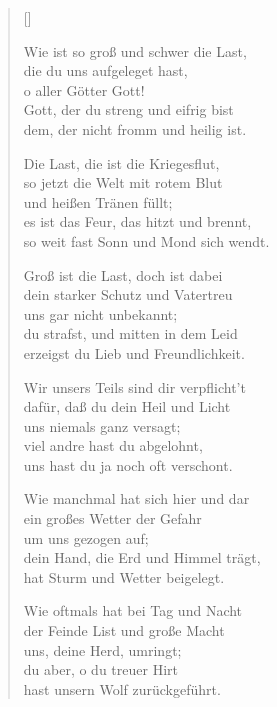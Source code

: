 \begin{multicols}{2}
\settowidth{\versewidth}{Wir unsers Teils sind dir verpflicht't}
\begin{verse}[\versewidth]

 Wie ist so groß und schwer die Last,\\
die du uns aufgeleget hast,\\
o aller Götter Gott!\\
Gott, der du streng und eifrig bist\\
dem, der nicht fromm und heilig ist.

 Die Last, die ist die Kriegesflut,\\
so jetzt die Welt mit rotem Blut\\
und heißen Tränen füllt;\\
es ist das Feur, das hitzt und brennt,\\
so weit fast Sonn und Mond sich wendt.

 Groß ist die Last, doch ist dabei\\
dein starker Schutz und Vatertreu\\
uns gar nicht unbekannt;\\
du strafst, und mitten in dem Leid\\
erzeigst du Lieb und Freundlichkeit.

 Wir unsers Teils sind dir verpflicht't\\
dafür, daß du dein Heil und Licht\\
uns niemals ganz versagt;\\
viel andre hast du abgelohnt,\\
uns hast du ja noch oft verschont.

 Wie manchmal hat sich hier und dar\\
ein großes Wetter der Gefahr\\
um uns gezogen auf;\\
dein Hand, die Erd und Himmel trägt,\\
hat Sturm und Wetter beigelegt.

 Wie oftmals hat bei Tag und Nacht\\
der Feinde List und große Macht\\
uns, deine Herd, umringt;\\
du aber, o du treuer Hirt\\
hast unsern Wolf zurückgeführt.


\end{verse}
\end{multicols}
